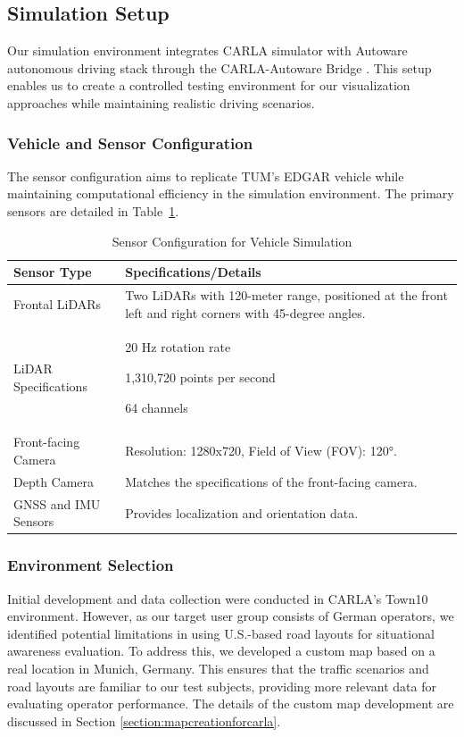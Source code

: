 \subsection{Simulation Setup}

Our simulation environment integrates CARLA simulator with Autoware autonomous driving stack through the CARLA-Autoware Bridge \cite{carla_aw_bridge24}. This setup enables us to create a controlled testing environment for our visualization approaches while maintaining realistic driving scenarios.


\subsubsection{Vehicle and Sensor Configuration}
The sensor configuration aims to replicate TUM's EDGAR vehicle while maintaining computational efficiency in the simulation environment. The primary sensors are detailed in Table~\ref{table:sensor_configuration}.

\begin{table}[h!]
\centering
\begin{tabular}{@{}p{4cm}p{10cm}@{}}
\toprule
\textbf{Sensor Type} & \textbf{Specifications/Details} \\
\midrule
Frontal LiDARs & Two LiDARs with 120-meter range, positioned at the front left and right corners with 45-degree angles. \\
\midrule
LiDAR Specifications &
20 Hz rotation rate \par
1,310,720 points per second \par
64 channels \\
\midrule
Front-facing Camera & Resolution: 1280x720, Field of View (FOV): 120°. \\
\midrule
Depth Camera & Matches the specifications of the front-facing camera. \\
\midrule
GNSS and IMU Sensors & Provides localization and orientation data. \\
\bottomrule
\end{tabular}
\caption{Sensor Configuration for Vehicle Simulation}
\label{table:sensor_configuration}
\end{table}

\subsubsection{Environment Selection}
Initial development and data collection were conducted in CARLA's Town10 environment. However, as our target user group consists of German operators, we identified potential limitations in using U.S.-based road layouts for situational awareness evaluation. To address this, we developed a custom map based on a real location in Munich, Germany. This ensures that the traffic scenarios and road layouts are familiar to our test subjects, providing more relevant data for evaluating operator performance. The details of the custom map development are discussed in Section \ref{section:mapcreationforcarla}.
